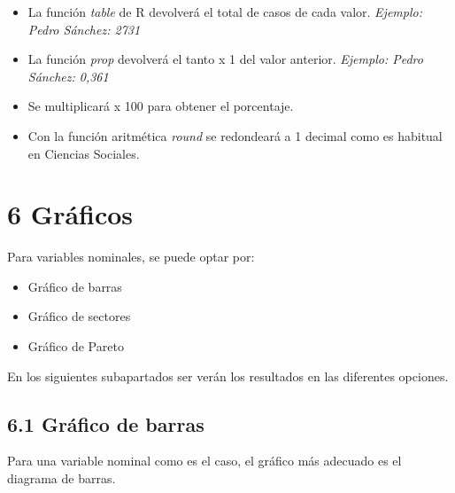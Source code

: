 \documentclass[
  12 pt,
  a4paper,
]{article}
\providecommand{\tightlist}{%
  \setlength{\itemsep}{0pt}\setlength{\parskip}{0pt}}
\begin{document}
\begin{itemize}
\tightlist
\item
  La función \emph{table} de R devolverá el total de casos de cada
  valor. \emph{Ejemplo: Pedro Sánchez: 2731}
\item
  La función \emph{prop} devolverá el tanto x 1 del valor anterior.
  \emph{Ejemplo: Pedro Sánchez: 0,361}
\item
  Se multiplicará x 100 para obtener el porcentaje.
\item
  Con la función aritmética \emph{round} se redondeará a 1 decimal como
  es habitual en Ciencias Sociales.
\end{itemize}

\newpage

\hypertarget{gruxe1ficos}{%
\section{6 Gráficos}\label{gruxe1ficos}}

Para variables nominales, se puede optar por:

\begin{itemize}
\tightlist
\item
  Gráfico de barras
\item
  Gráfico de sectores
\item
  Gráfico de Pareto
\end{itemize}

En los siguientes subapartados ser verán los resultados en las
diferentes opciones.

\hypertarget{gruxe1fico-de-barras}{%
\subsection{6.1 Gráfico de barras}\label{gruxe1fico-de-barras}}

Para una variable nominal como es el caso, el gráfico más adecuado es el
diagrama de barras.
\end{document}
